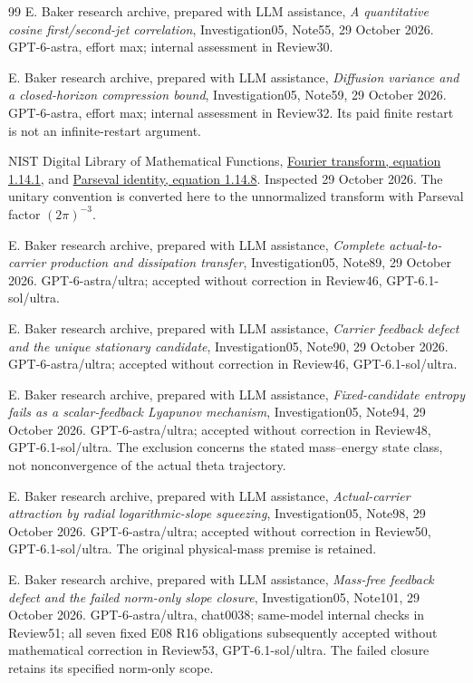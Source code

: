 \documentclass[11pt]{article}
\numberwithin{equation}{section}
\begin{document}
\begin{thebibliography}{99}
E. Baker research archive, prepared with LLM assistance,
\emph{A quantitative cosine first/second-jet correlation},
Investigation05, Note55, 29 October 2026.
GPT-6-astra, effort max; internal assessment in Review30.

E. Baker research archive, prepared with LLM assistance,
\emph{Diffusion variance and a closed-horizon compression bound},
Investigation05, Note59, 29 October 2026.
GPT-6-astra, effort max; internal assessment in Review32.
Its paid finite restart is not an infinite-restart argument.

NIST Digital Library of Mathematical Functions,
\href{https://dlmf.nist.gov/1.14.E1}{Fourier transform, equation 1.14.1},
and \href{https://dlmf.nist.gov/1.14.E8}{Parseval identity, equation 1.14.8}.
Inspected 29 October 2026. The unitary convention is converted here
to the unnormalized transform with Parseval factor $(2\pi)^{-3}$.


E. Baker research archive, prepared with LLM assistance,
\emph{Complete actual-to-carrier production and dissipation transfer},
Investigation05, Note89, 29 October 2026. GPT-6-astra/ultra;
accepted without correction in Review46, GPT-6.1-sol/ultra.

E. Baker research archive, prepared with LLM assistance,
\emph{Carrier feedback defect and the unique stationary candidate},
Investigation05, Note90, 29 October 2026. GPT-6-astra/ultra;
accepted without correction in Review46, GPT-6.1-sol/ultra.

E. Baker research archive, prepared with LLM assistance,
\emph{Fixed-candidate entropy fails as a scalar-feedback Lyapunov mechanism},
Investigation05, Note94, 29 October 2026. GPT-6-astra/ultra;
accepted without correction in Review48, GPT-6.1-sol/ultra.
The exclusion concerns the stated mass--energy state class, not
nonconvergence of the actual theta trajectory.

E. Baker research archive, prepared with LLM assistance,
\emph{Actual-carrier attraction by radial logarithmic-slope squeezing},
Investigation05, Note98, 29 October 2026. GPT-6-astra/ultra;
accepted without correction in Review50, GPT-6.1-sol/ultra.
The original physical-mass premise is retained.

E. Baker research archive, prepared with LLM assistance,
\emph{Mass-free feedback defect and the failed norm-only slope closure},
Investigation05, Note101, 29 October 2026. GPT-6-astra/ultra, chat0038;
same-model internal checks in Review51; all seven fixed E08 R16
obligations subsequently accepted without mathematical correction in
Review53, GPT-6.1-sol/ultra. The failed closure retains its specified
norm-only scope.


\end{thebibliography}
\end{document}
